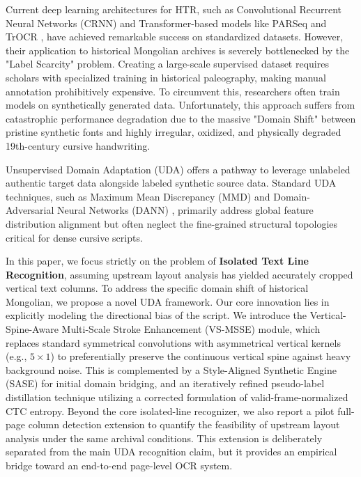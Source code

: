 \documentclass[11pt]{article}
\begin{document}
Current deep learning architectures for HTR, such as Convolutional Recurrent Neural Networks (CRNN) \cite{shi2016end} and Transformer-based models like PARSeq \cite{bautista2022parseq} and TrOCR \cite{li2021trocr}, have achieved remarkable success on standardized datasets. However, their application to historical Mongolian archives is severely bottlenecked by the "Label Scarcity" problem. Creating a large-scale supervised dataset requires scholars with specialized training in historical paleography, making manual annotation prohibitively expensive. To circumvent this, researchers often train models on synthetically generated data. Unfortunately, this approach suffers from catastrophic performance degradation due to the massive "Domain Shift" between pristine synthetic fonts and highly irregular, oxidized, and physically degraded 19th-century cursive handwriting.

Unsupervised Domain Adaptation (UDA) offers a pathway to leverage unlabeled authentic target data alongside labeled synthetic source data. Standard UDA techniques, such as Maximum Mean Discrepancy (MMD) \cite{tzeng2014deep} and Domain-Adversarial Neural Networks (DANN) \cite{ganin2015unsupervised}, primarily address global feature distribution alignment but often neglect the fine-grained structural topologies critical for dense cursive scripts.

In this paper, we focus strictly on the problem of \textbf{Isolated Text Line Recognition}, assuming upstream layout analysis has yielded accurately cropped vertical text columns. To address the specific domain shift of historical Mongolian, we propose a novel UDA framework. Our core innovation lies in explicitly modeling the directional bias of the script. We introduce the Vertical-Spine-Aware Multi-Scale Stroke Enhancement (VS-MSSE) module, which replaces standard symmetrical convolutions with asymmetrical vertical kernels (e.g., $5\times1$) to preferentially preserve the continuous vertical spine against heavy background noise. This is complemented by a Style-Aligned Synthetic Engine (SASE) for initial domain bridging, and an iteratively refined pseudo-label distillation technique utilizing a corrected formulation of valid-frame-normalized CTC entropy. Beyond the core isolated-line recognizer, we also report a pilot full-page column detection extension to quantify the feasibility of upstream layout analysis under the same archival conditions. This extension is deliberately separated from the main UDA recognition claim, but it provides an empirical bridge toward an end-to-end page-level OCR system.
\end{document}
